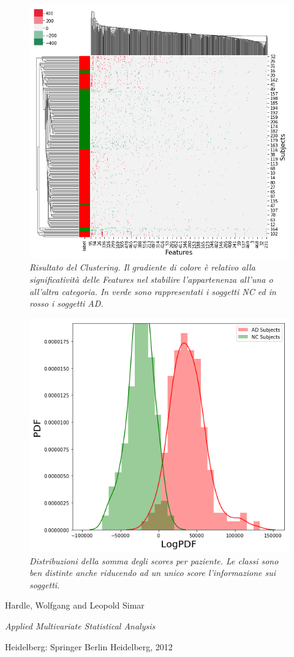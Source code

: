 \documentclass[12pt,openright,a4paper]{article}
\begin{document}
\begin{figure}[!h]
\centering
\includegraphics[scale=0.5]{logpdf-clustering10}
\caption{\textit{Risultato del Clustering. Il gradiente di colore è relativo alla significatività delle Features nel stabilire l'appartenenza all'una o all'altra categoria. In verde sono rappresentati i soggetti NC ed in rosso i soggetti AD. }}
\label{logpdf-clustering10}
\end{figure}

\begin{figure}[!h]
\centering
\includegraphics[scale=0.6]{logpdf-dist}
\caption{\textit{Distribuzioni della somma degli scores per paziente. Le classi sono ben distinte anche riducendo ad un unico score l'informazione sui soggetti.}}
\label{logpdf-dist}
\end{figure}


\clearpage

\begin{thebibliography}{99}

Hardle, Wolfgang and Leopold Simar

\emph{Applied Multivariate Statistical Analysis}

Heidelberg: Springer Berlin Heidelberg, 2012

\end{thebibliography}
\end{document}
